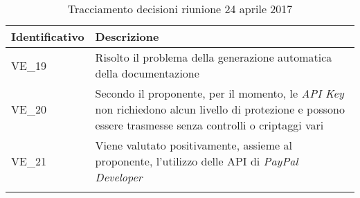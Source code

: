 \begin{longtable}{|>{\centering\arraybackslash}p{4cm}|>{\centering\arraybackslash}p{9cm}|}
	\hline \rowcolor{Gray}
	\textbf{Identificativo} & \textbf{Descrizione}\\
	\hline
	\endhead
			VE\_19	&  Risolto il problema della generazione automatica della documentazione \\
			\hline
			VE\_20 & Secondo il proponente, per il momento, le \textit{API Key} non richiedono alcun livello di protezione e possono essere trasmesse senza controlli o criptaggi vari \\
			\hline
			VE\_21 & Viene valutato positivamente, assieme al proponente, l'utilizzo delle API di \textit{PayPal Developer}\\
			\hline
		\caption{Tracciamento decisioni riunione 24 aprile 2017}
\end{longtable}